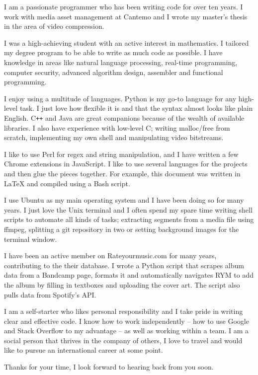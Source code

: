 I am a passionate programmer who has been writing code for over ten years. I work with media asset management at Cantemo and I wrote my master's thesis in the area of video compression.

I was a high-achieving student with an active interest in mathematics. I tailored my degree program to be able to write as much code as possible. I have knowledge in areas like natural language processing, real-time programming, computer security, advanced algorithm design, assembler and functional programming.

I enjoy using a multitude of languages. Python is my go-to language for any high-level task. I just love how flexible it is and that the syntax almost looks like plain English. C\texttt{++} and Java are great companions because of the wealth of available libraries. I also have experience with low-level C; writing malloc/free from scratch, implementing my own shell and manipulating video bitstreams.

I like to use Perl for regex and string manipulation, and I have written a few Chrome extensions in JavaScript. I like to use several languages for the projects and then glue the pieces together. For example, this document was written in LaTeX and compiled using a Bash script.

I use Ubuntu as my main operating system and I have been doing so for many years. I just love the Unix terminal and I often spend my spare time writing shell scripts to automate all kinds of tasks; extracting segments from a media file using ffmpeg, splitting a git repository in two or setting background images for the terminal window.

I have been an active member on Rateyourmusic.com for many years, contributing to the their database. I wrote a Python script that scrapes album data from a Bandcamp page, formats it and automatically navigates RYM to add the album by filling in textboxes and uploading the cover art. The script also pulls data from Spotify's API.

I am a self-starter who likes personal responsibility and I take pride in writing clear and effective code. I know how to work independently -- how to use Google and Stack Overflow to my advantage -- as well as working within a team. I am a social person that thrives in the company of others, I love to travel and would like to pursue an international career at some point.

Thanks for your time, I look forward to hearing back from you soon.
